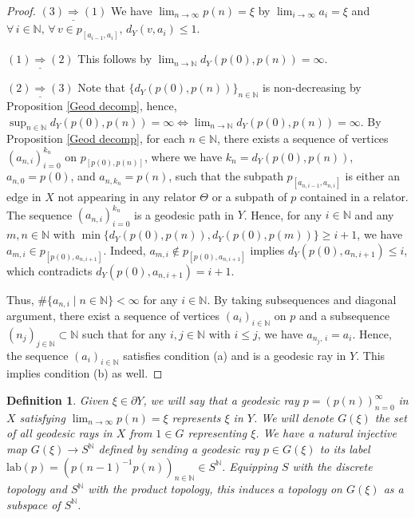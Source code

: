 \documentclass{article}[11pt]
\newtheorem{defn}[thm]{Definition}
\newcommand{\N}{\mathbb{N}}
\begin{document}
{{\begin{proof}
    $\underline{(3)\Rightarrow(1)}$ We have $\lim_{n \to \infty}p(n) = \xi$ by $\lim_{i \to \infty}a_i = \xi$ and $\forall\,i \in \N,\,\forall\, v \in p_{[a_{i-1}, a_i]},\,d_Y(v,a_i) \le 1$.
    
    $\underline{(1)\Rightarrow(2)}$ This follows by $\lim_{n \to \N}d_Y(p(0),p(n))= \infty$.
    
    $\underline{(2)\Rightarrow(3)}$ Note that $\{d_Y(p(0),p(n))\}_{n \in \N}$ is non-decreasing by Proposition \ref{Geod decomp}, hence, $\sup_{n \in \N}d_Y(p(0),p(n))= \infty \iff \lim_{n \to \N}d_Y(p(0),p(n))= \infty$. By Proposition \ref{Geod decomp}, for each $n \in \N$, there exists a sequence of vertices $(a_{n,i})_{i = 0}^{k_n}$ on $p_{[p(0),p(n)]}$, where we have $k_n = d_Y(p(0),p(n))$, $a_{n,0}=p(0)$, and $a_{n,k_n}=p(n)$, such that the subpath $p_{[a_{n,i-1}, a_{n,i}]}$ is either an edge in $X$ not appearing in any relator $\Theta$ or a subpath of $p$ contained in a relator. The sequence $(a_{n,i})_{i = 0}^{k_n}$ is a geodesic path in $Y$. Hence, for any $i \in \N$ and any $m,n\in \N$ with $\min\{d_Y(p(0),p(n)), d_Y(p(0),p(m))\} \ge i+1$, we have $a_{m,i} \in p_{[p(0),a_{n,i+1}]}$. Indeed, $a_{m,i} \notin p_{[p(0),a_{n,i+1}]}$ implies $d_Y(p(0),a_{n,i+1}) \le i$, which contradicts $d_Y(p(0),a_{n,i+1}) = i+1$. 
    
    Thus, $\#\{a_{n,i} \mid n \in \N\} < \infty$ for any $i \in \N$. By taking subsequences and diagonal argument, there exist a sequence of vertices $(a_i)_{i \in \N}$ on $p$ and a subsequence $(n_j)_{j \in \N} \subset \N$ such that for any $i,j \in \N$ with $i \le j$, we have $a_{n_j,\,i} = a_i$. Hence, the sequence $(a_i)_{i \in \N}$ satisfies condition (a) and is a geodesic ray in $Y$. This implies condition (b) as well.
\end{proof}

\begin{defn}
    Given $\xi \in \partial Y$, we will say that a geodesic ray $p=(p(n))_{n = 0}^\infty$ in $X$ satisfying $\lim_{n \to \infty} p(n) = \xi$ \emph{represents} $\xi$ in $Y$. We will denote $G(\xi)$ the set of all geodesic rays in $X$ from $1 \in G$ representing $\xi$. We have a natural injective map $G(\xi) \to S^{\N}$ defined by sending a geodesic ray $p \in G(\xi)$ to its label $\mathrm{lab}(p) = (p(n-1)^{-1}p(n))_{n \in \N} \in S^{\N}$. Equipping $S$ with the discrete topology and $S^{\N}$ with the product topology, this induces a topology on $G(\xi)$ as a subspace of $S^{\N}$.
\end{defn}
}

}
\end{document}
